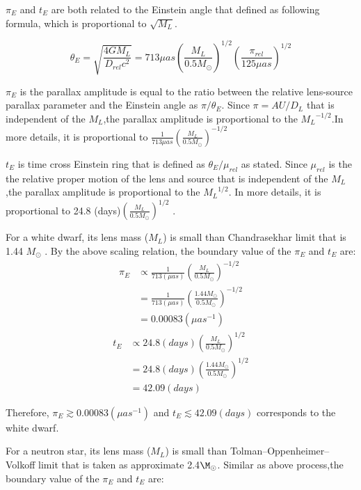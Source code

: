 \documentclass[preprint]{aastex63}
\begin{document}
$\pi_E$ and $t_E$ are both related to the Einstein angle that defined as following formula, which is proportional to $\sqrt{M_L}$.

\begin{equation}
    \theta_E = \sqrt{\frac{4GM_L}{D_{rel}c^2}}=713\mu as (\frac{M_L}{0.5M_\odot})^{1/2}(\frac{\pi_{rel}}{125 \mu as})^{1/2}
\end{equation}

$\pi_E$ is the parallax amplitude is equal to the ratio between the relative lens-source parallax parameter and the Einstein angle as $\pi/\theta_E$. Since $\pi=AU/D_{L}$ that is independent of the $M_L$,the parallax amplitude is proportional to the ${M_L}^{-1/2}$.In more details, it is  proportional to $\frac{1}{713\mu as} (\frac{M_L}{0.5M_\odot})^{-1/2}$\par
$t_E$ is time cross Einstein ring that is defined as $\theta_E/\mu_{rel}$ as stated. Since $\mu_{rel}$ is the the relative proper motion of the lens and source that is independent of the $M_L$,the parallax amplitude is proportional to the ${M_L}^{1/2}$. In more details, it is proportional to 24.8 (days)$(\frac{M_L}{0.5M_\odot})^{1/2}$ \cite{2012ARA&A..50..411G}.\par

For a white dwarf, its lens mass ($M_L$) is small than Chandrasekhar limit that is 1.44 $M_\odot$ \cite{Carroll2007}. By the above scaling relation, the boundary value of the $\pi_E$ and $t_E$ are:
\begin{align*}
    \pi_E&\propto\frac{1}{713(\mu as)} (\frac{M_L}{0.5M_\odot})^{-1/2}\\
    &=\frac{1}{713(\mu as)} (\frac{1.44M_\odot}{0.5M_\odot})^{-1/2}\\
    &=0.00083 (\mu as^{-1})
\end{align*}
\begin{align*}
    t_E&\propto24.8 (days)(\frac{M_L}{0.5M_\odot})^{1/2}\\
    &=24.8 (days)(\frac{1.44M_\odot}{0.5M_\odot})^{1/2}\\
    &=42.09 (days)
\end{align*}


Therefore, $\pi_E\gtrsim0.00083 (\mu as^{-1})$ and $t_E\lesssim 42.09 (days)$ corresponds to the white dwarf.

For a neutron star, its lens mass ($M_L$) is small than Tolman–Oppenheimer–Volkoff limit that is taken as approximate 2.4$\M_\odot$\cite{Gao_2016}. Similar as above process,the boundary value of the $\pi_E$ and $t_E$ are:
\end{document}
